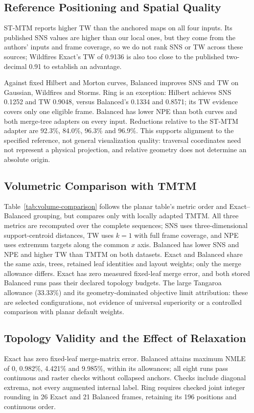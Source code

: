 \documentclass[review]{vgtc}
\begin{document}
\subsection{Reference Positioning and Spatial Quality}

ST-MTM reports higher TW than the anchored maps on all four inputs. Its published SNS values are higher than our local ones, but they come from the authors' inputs and frame coverage, so we do not rank SNS or TW across these sources; Wildfires Exact's TW of 0.9136 is also too close to the published two-decimal 0.91 to establish an advantage.

Against fixed Hilbert and Morton curves, Balanced improves SNS and TW on Gaussian, Wildfires and Storms. Ring is an exception: Hilbert achieves SNS 0.1252 and TW 0.9048, versus Balanced's 0.1334 and 0.8571; its TW evidence covers only one eligible frame. Balanced has lower NPE than both curves and both merge-tree adapters on every input. Reductions relative to the ST-MTM adapter are 92.3\%, 84.0\%, 96.3\% and 96.9\%. This supports alignment to the specified reference, not general visualization quality: traversal coordinates need not represent a physical projection, and relative geometry does not determine an absolute origin.

\subsection{Volumetric Comparison with TMTM}

Table~\ref{tab:volume-comparison} follows the planar table's metric order and Exact--Balanced grouping, but compares only with locally adapted TMTM. All three metrics are recomputed over the complete sequences; SNS uses three-dimensional support-centroid distances, TW uses $k=1$ with full frame coverage, and NPE uses extremum targets along the common $x$ axis. Balanced has lower SNS and NPE and higher TW than TMTM on both datasets. Exact and Balanced share the same axis, trees, retained leaf identities and layout weights; only the merge allowance differs. Exact has zero measured fixed-leaf merge error, and both stored Balanced runs pass their declared topology budgets. The large Tangaroa allowance (33.33\%) and its geometry-dominated objective limit attribution: these are selected configurations, not evidence of universal superiority or a controlled comparison with planar default weights.

\subsection{Topology Validity and the Effect of Relaxation}
Exact has zero fixed-leaf merge-matrix error. Balanced attains maximum NMLE of 0, 0.982\%, 4.421\% and 9.985\%, within its allowances; all eight runs pass continuous and raster checks without collapsed anchors. Checks include diagonal extrema, not every augmented internal label. Ring requires checked joint integer rounding in 26 Exact and 21 Balanced frames, retaining its 196 positions and continuous order.
\end{document}
